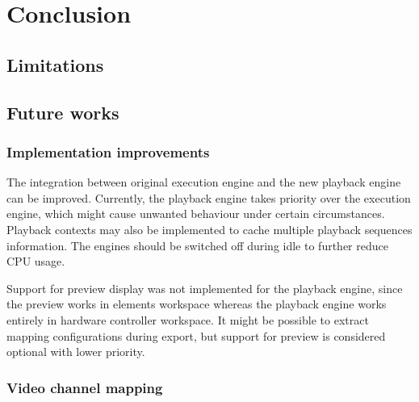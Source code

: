 \chapter{Conclusion}
\renewcommand{\baselinestretch}{\mystretch}
\label{chap:Conclusion}


\section{Limitations}


\section{Future works}

\subsection{Implementation improvements}
\hfill
The integration between original execution engine and the new playback engine can be improved. Currently, the playback engine takes priority over the execution engine, which might cause unwanted behaviour under certain circumstances. Playback contexts may also be implemented to cache multiple playback sequences information. The engines should be switched off during idle to further reduce CPU usage.

Support for preview display was not implemented for the playback engine, since the preview works in elements workspace whereas the playback engine works entirely in hardware controller workspace. It might be possible to extract mapping configurations during export, but support for preview is considered optional with lower priority.

\subsection{Video channel mapping}
\hfill
{}
